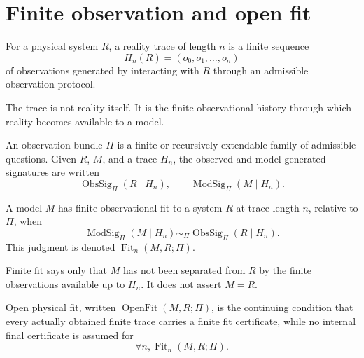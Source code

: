 \section{Finite observation and open fit}
\label{sec:finite-observation-open-fit}

\begin{definition}
\label{def:reality-trace}
For a physical system $R$, a reality trace of length $n$ is a finite sequence
$$
H_n(R)=(o_0,o_1,\ldots,o_n)
$$
of observations generated by interacting with $R$ through an admissible observation protocol.
\end{definition}

The trace is not reality itself. It is the finite observational history through which reality becomes available to a model.

\begin{definition}
\label{def:observation-bundle}
An observation bundle $\Pi$ is a finite or recursively extendable family of admissible questions. Given $R$, $M$, and a trace $H_n$, the observed and model-generated signatures are written
$$
\operatorname{ObsSig}_{\Pi}(R\mid H_n),
\qquad
\operatorname{ModSig}_{\Pi}(M\mid H_n).
$$
\end{definition}

\begin{definition}
\label{def:finite-observational-fit}
A model $M$ has finite observational fit to a system $R$ at trace length $n$, relative to $\Pi$, when
$$
\operatorname{ModSig}_{\Pi}(M\mid H_n)
\sim_{\Pi}
\operatorname{ObsSig}_{\Pi}(R\mid H_n).
$$
This judgment is denoted $\operatorname{Fit}_n(M,R;\Pi)$.
\end{definition}

Finite fit says only that $M$ has not been separated from $R$ by the finite observations available up to $H_n$. It does not assert $M=R$.

\begin{definition}
\label{def:open-physical-fit}
Open physical fit, written $\operatorname{OpenFit}(M,R;\Pi)$, is the continuing condition that every actually obtained finite trace carries a finite fit certificate, while no internal final certificate is assumed for
$$
\forall n,\operatorname{Fit}_n(M,R;\Pi).
$$
\end{definition}

